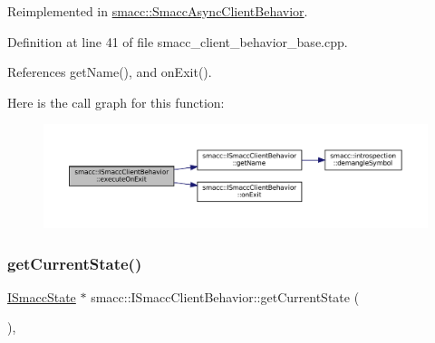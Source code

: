 Reimplemented in \hyperlink{classsmacc_1_1SmaccAsyncClientBehavior_a3d982d370df4f133ad37c0b2370e9b82}{smacc\+::\+Smacc\+Async\+Client\+Behavior}.



Definition at line 41 of file smacc\+\_\+client\+\_\+behavior\+\_\+base.\+cpp.



References get\+Name(), and on\+Exit().


Here is the call graph for this function\+:
\nopagebreak
\begin{figure}[H]
\begin{center}
\leavevmode
\includegraphics[width=350pt]{classsmacc_1_1ISmaccClientBehavior_ac88fbad78c928b4bca6d18659ddfd8c0_cgraph}
\end{center}
\end{figure}
\mbox{\label{classsmacc_1_1ISmaccClientBehavior_a34fde34e48fa13db622ee60d8374d0b8}} 
\subsubsection{\texorpdfstring{get\+Current\+State()}{getCurrentState()}}
{\footnotesize\ttfamily \hyperlink{classsmacc_1_1ISmaccState}{I\+Smacc\+State} $\ast$ smacc\+::\+I\+Smacc\+Client\+Behavior\+::get\+Current\+State (\begin{DoxyParamCaption}{ }\end{DoxyParamCaption})\hspace{0.3cm}{\ttfamily [inline]}, {\ttfamily [protected]}}



